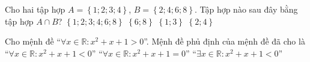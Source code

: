 \documentclass[12pt,a4paper,openany,oneside]{book}
\begin{document}
\begin{ex}%
	Cho hai tập hợp $A=\left\{1;2;3;4\right\}$, $B=\left\{ 2;4;6;8 \right\}$. Tập hợp nào sau đây  bằng tập hợp $A\cap B$?
	 \choice
		{$\left\{1;2;3;4;6;8 \right\}$}
		 {$\left\{6;8  \right\}$}
		{$\left\{1;3 \right\}$}
		 {\True$\left\{ 2;4  \right\}$}
\end{ex}

\begin{ex}%
	Cho mệnh đề ``$\forall x \in  \mathbb{R} : x^2+x+1>0$''. Mệnh đề phủ định của mệnh đề đã cho là
		 {``$\forall x \in \mathbb{R} :x^2+x+1 < 0$''}
		{``$\forall x \in \mathbb{R} :x^2+x+1 = 0$''}
		{``$\exists x  \in \mathbb{R} :x^2+x+1 < 0$''}
\end{ex}
\end{document}
